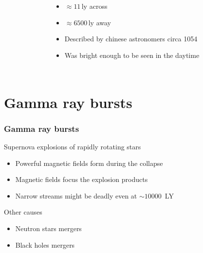 \documentclass[aspectratio=169]{beamer}
\begin{document}
\begin{frame}
{\begin{columns}[c]
\begin{figure}
\end{figure}
\begin{itemize}
\item $\approx 11 \, \mathrm{ly}$ across
\item $\approx 6500 \, \mathrm{ly}$ away
\item Described by chinese astronomers circa 1054
\item Was bright enough to be seen in the daytime
\end{itemize}
\end{columns}
}
\end{frame}

\section{Gamma ray bursts}
\begin{frame}
\frametitle{Gamma ray bursts}
\begin{block}{Supernova explosions of rapidly rotating stars}
\begin{itemize}
\item Powerful magnetic fields form during the collapse
\item Magnetic fields focus the explosion products
\item Narrow streams might be deadly even at $\sim 10000$~LY
\end{itemize}
\end{block}
\begin{block}{Other causes}
\begin{itemize}
\item Neutron stars mergers
\item Black holes mergers
\end{itemize}
\end{block}
\end{frame}
\end{document}
